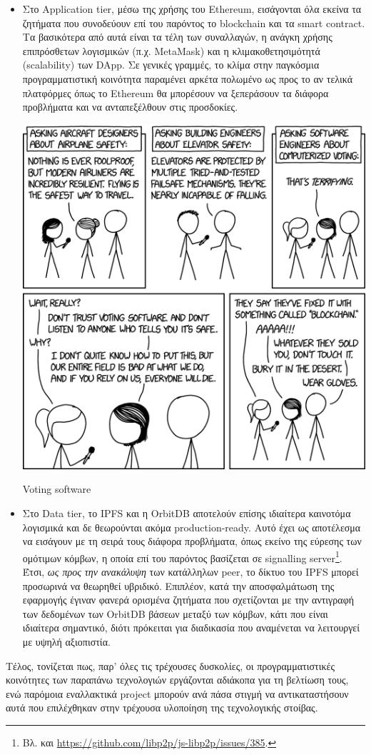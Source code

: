 \begin{itemize}
	\item Στο Application tier, μέσω της χρήσης του Ethereum, εισάγονται όλα εκείνα τα ζητήματα που συνοδεύουν επί του παρόντος το blockchain και τα smart contract. Τα βασικότερα από αυτά είναι τα τέλη των συναλλαγών, η ανάγκη χρήσης επιπρόσθετων λογισμικών (π.χ. MetaMask) και η κλιμακοθετησιμότητά (scalability) των DApp. Σε γενικές γραμμές, το κλίμα στην παγκόσμια προγραμματιστική κοινότητα παραμένει αρκέτα πολωμένο ως προς το αν τελικά πλατφόρμες όπως το Ethereum θα μπορέσουν να ξεπεράσουν τα διάφορα προβλήματα και να ανταπεξέλθουν στις προσδοκίες.

	\begin{enumitemcenteredfigure}
		\includegraphics[width=.65\textwidth]{assets/figures/chapter-5/5.1.xkcd_2030_voting_software}
		\caption[Voting software]{Voting software\footnotemark}
	\end{enumitemcenteredfigure}

	\item Στο Data tier, το IPFS και η OrbitDB αποτελούν επίσης ιδιαίτερα καινοτόμα λογισμικά και δε θεωρούνται ακόμα production-ready. Αυτό έχει ως αποτέλεσμα να εισάγουν με τη σειρά τους διάφορα προβλήματα, όπως εκείνο της εύρεσης των ομότιμων κόμβων, η οποία επί του παρόντος βασίζεται σε signalling server\footnote{Βλ. και \url{https://github.com/libp2p/js-libp2p/issues/385}.}. Έτσι, \textit{ως προς την ανακάλυψη} των κατάλληλων peer, το δίκτυο του IPFS μπορεί προσωρινά να θεωρηθεί υβριδικό. Επιπλέον, κατά την αποσφαλμάτωση της εφαρμογής έγιναν φανερά ορισμένα ζητήματα που σχετίζονται με την αντιγραφή των δεδομένων των OrbitDB βάσεων μεταξύ των κόμβων, κάτι που είναι ιδιαίτερα σημαντικό, διότι πρόκειται για διαδικασία που αναμένεται να λειτουργεί με υψηλή αξιοπιστία.
\end{itemize}

Τέλος, τονίζεται πως, παρ' όλες τις τρέχουσες δυσκολίες, οι προγραμματιστικές κοινότητες των παραπάνω τεχνολογιών εργάζονται αδιάκοπα για τη βελτίωση τους, ενώ παρόμοια εναλλακτικά project μπορούν ανά πάσα στιγμή να αντικαταστήσουν αυτά που επιλέχθηκαν στην τρέχουσα υλοποίηση της τεχνολογικής στοίβας.
